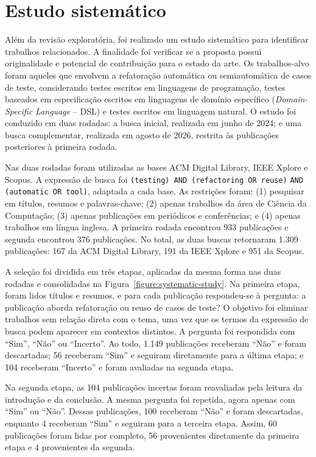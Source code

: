 \section{Estudo sistemático}

Além da revisão exploratória, foi realizado um estudo sistemático para identificar trabalhos relacionados. A finalidade foi verificar se a proposta possui originalidade e potencial de contribuição para o estado da arte. Os trabalhos-alvo foram aqueles que envolvem a refatoração automática ou semiautomática de casos de teste, considerando testes escritos em linguagens de programação, testes baseados em especificação escritos em linguagens de domínio específico (\textit{Domain-Specific Language} -- DSL) e testes escritos em linguagem natural. O estudo foi conduzido em duas rodadas: a busca inicial, realizada em junho de 2024; e uma busca complementar, realizada em agosto de 2026, restrita às publicações posteriores à primeira rodada.

Nas duas rodadas foram utilizadas as bases ACM Digital Library, IEEE Xplore e Scopus. A expressão de busca foi \texttt{(testing) AND (refactoring OR reuse)} \texttt{AND (automatic OR tool)}, adaptada a cada base. As restrições foram: (1) pesquisar em títulos, resumos e palavras-chave; (2) apenas trabalhos da área de Ciência da Computação; (3) apenas publicações em periódicos e conferências; e (4) apenas trabalhos em língua inglesa. A primeira rodada encontrou 933 publicações e segunda encontrou 376 publicações. No total, as duas buscas retornaram 1.309 publicações: 167 da ACM Digital Library, 191 da IEEE Xplore e 951 da Scopus.

A seleção foi dividida em três etapas, aplicadas da mesma forma nas duas rodadas e consolidadas na Figura~\ref{figure:systematic-study}. Na primeira etapa, foram lidos títulos e resumos, e para cada publicação respondeu-se à pergunta: a publicação aborda refatoração ou reuso de casos de teste? O objetivo foi eliminar trabalhos sem relação direta com o tema, uma vez que os termos da expressão de busca podem aparecer em contextos distintos. A pergunta foi respondida com ``Sim'', ``Não'' ou ``Incerto''. Ao todo, 1.149 publicações receberam ``Não'' e foram descartadas; 56 receberam ``Sim'' e seguiram diretamente para a última etapa; e 104 receberam ``Incerto'' e foram avaliadas na segunda etapa.

Na segunda etapa, as 104 publicações incertas foram reavaliadas pela leitura da introdução e da conclusão. A mesma pergunta foi repetida, agora apenas com ``Sim'' ou ``Não''. Dessas publicações, 100 receberam ``Não'' e foram descartadas, enquanto 4 receberam ``Sim'' e seguiram para a terceira etapa. Assim, 60 publicações foram lidas por completo, 56 provenientes diretamente da primeira etapa e 4 provenientes da segunda.

